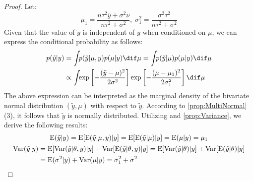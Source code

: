 \begin{proof}
	Let:
	\begin{equation*}
		\mu_1=\frac{n\tau^2\bar{y}+\sigma^2\nu}{n\tau^2+\sigma^2},\;\sigma^2_1=\frac{\sigma^2\tau^2}{n\tau^2+\sigma^2}
	\end{equation*}
	Given that the value of $\tilde{y}$ is independent of $y$ when conditioned on $\mu$, we can express the conditional probability as follows:
	\begin{align*}
		p(\tilde{y}|y)
		&=\int_{}p(\tilde{y}|\mu,y)p(\mu|y)\dif\mu=\int_{}p(\tilde{y}|\mu)p(\mu|y)\dif\mu \\
		&\propto\int_{}\exp\left[-\frac{(\tilde{y}-\mu)^2}{2\sigma^2}\right]\exp\left[-\frac{(\mu-\mu_1)^2}{2\sigma_1^2}\right]\dif\mu	
	\end{align*}
	The above expression can be interpreted as the marginal density of the bivariate normal distribution $(\tilde{y}, \mu)$ with respect to $\tilde{y}$. According to \cref{prop:MultiNormal}(3), it follows that $\tilde{y}$ is normally distributed. Utilizing  and \cref{prop:Variance}, we derive the following results:
	\begin{gather*}
		\operatorname{E}(\tilde{y}|y)=\operatorname{E}[\operatorname{E}(\tilde{y}|\mu,y)|y]=\operatorname{E}[\operatorname{E}(\tilde{y}|\mu)|y]=\operatorname{E}(\mu|y)=\mu_1 \\
		\begin{aligned}
			\operatorname{Var}(\tilde{y}|y)&=\operatorname{E}[\operatorname{Var}(\tilde{y}|\theta,y)|y]+\operatorname{Var}[\operatorname{E}(\tilde{y}|\theta,y)|y]=\operatorname{E}[\operatorname{Var}(\tilde{y}|\theta)|y]+\operatorname{Var}[\operatorname{E}(\tilde{y}|\theta)|y] \\
			&=\operatorname{E}(\sigma^2|y)+\operatorname{Var}(\mu|y)=\sigma_1^2+\sigma^2
		\end{aligned}\qedhere
	\end{gather*}
\end{proof}
